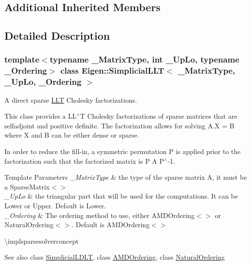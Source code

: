 \subsection*{Additional Inherited Members}


\subsection{Detailed Description}
\subsubsection*{template$<$typename \+\_\+\+Matrix\+Type, int \+\_\+\+Up\+Lo, typename \+\_\+\+Ordering$>$\newline
class Eigen\+::\+Simplicial\+L\+L\+T$<$ \+\_\+\+Matrix\+Type, \+\_\+\+Up\+Lo, \+\_\+\+Ordering $>$}

A direct sparse \mbox{\hyperlink{class_eigen_1_1_l_l_t}{L\+LT}} Cholesky factorizations. 

This class provides a L\+L$^\wedge$T Cholesky factorizations of sparse matrices that are selfadjoint and positive definite. The factorization allows for solving A.\+X = B where X and B can be either dense or sparse.

In order to reduce the fill-\/in, a symmetric permutation P is applied prior to the factorization such that the factorized matrix is P A P$^\wedge$-\/1.


\begin{DoxyTemplParams}{Template Parameters}
{\em \+\_\+\+Matrix\+Type} & the type of the sparse matrix A, it must be a Sparse\+Matrix$<$$>$ \\
\hline
{\em \+\_\+\+Up\+Lo} & the triangular part that will be used for the computations. It can be Lower or Upper. Default is Lower. \\
\hline
{\em \+\_\+\+Ordering} & The ordering method to use, either A\+M\+D\+Ordering$<$$>$ or Natural\+Ordering$<$$>$. Default is A\+M\+D\+Ordering$<$$>$\\
\hline
\end{DoxyTemplParams}
\textbackslash{}implsparsesolverconcept

\begin{DoxySeeAlso}{See also}
class \mbox{\hyperlink{class_eigen_1_1_simplicial_l_d_l_t}{Simplicial\+L\+D\+LT}}, class \mbox{\hyperlink{class_eigen_1_1_a_m_d_ordering}{A\+M\+D\+Ordering}}, class \mbox{\hyperlink{class_eigen_1_1_natural_ordering}{Natural\+Ordering}} 
\end{DoxySeeAlso}


